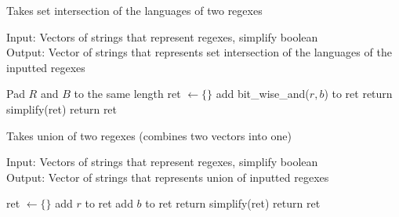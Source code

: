 \documentclass[runningheads]{llncs}
\begin{document}
\begin{algorithm}[H]
\caption{Takes set intersection of the languages of two regexes}
Input: Vectors of strings that represent regexes, simplify boolean\\
Output: Vector of strings that represents set intersection of the languages of the inputted regexes
\begin{algorithmic}
    \State Pad $R$ and $B$ to the same length
    \State ret $\leftarrow \{\}$ 
         
            \State add bit\_wise\_and($r, b$) to ret 
        \EndFor
    \EndFor
    \State return simplify(ret) 
    \Else
    \State return ret
    \EndIf
\EndProcedure
\end{algorithmic}
\end{algorithm}
\begin{algorithm}[H]
\caption{Takes union of two regexes (combines two vectors into one)}
Input: Vectors of strings that represent regexes, simplify boolean\\
Output: Vector of strings that represents union of inputted regexes
\begin{algorithmic}
    \State ret $\leftarrow \{\}$ 
        \State add $r$ to ret 
    \EndFor
        \State add $b$ to ret 
    \EndFor
    \State return simplify(ret) 
    \Else
    \State return ret
    \EndIf
\EndProcedure
\end{algorithmic}
\end{algorithm}
\end{document}
